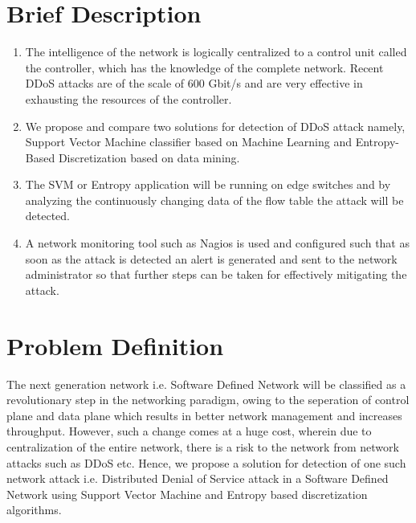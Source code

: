 \documentclass[12pt,a4paper,final]{report}
\begin{document}
\section{Brief Description}
\begin{enumerate}
\item 
The intelligence of the network is logically centralized to a control unit called the controller, which has the knowledge of the complete network. Recent DDoS attacks are of the scale of 600 Gbit/s and are very effective in exhausting the resources of the controller.

\item
We propose and compare two solutions for detection of DDoS attack namely, Support Vector Machine classifier based on Machine Learning and Entropy-Based Discretization based on data mining.

\item
The SVM or Entropy application will be running on edge switches and by analyzing the continuously changing data of the flow table the attack will be detected.

\item
A network monitoring tool such as Nagios is used and configured such that as soon as the attack is detected an alert is generated and sent to the network administrator so that further steps can be taken for effectively mitigating the attack.
\end{enumerate}

\section{Problem Definition}
The next generation network i.e. Software Defined Network will be classified as a revolutionary step in the networking paradigm, owing to the seperation of control plane and data plane which results in better network management and increases throughput. However, such a change comes at a huge cost, wherein due to centralization of the entire network, there is a risk to the network from network attacks such as DDoS etc. Hence, we propose a solution for detection of one such network attack i.e. Distributed Denial of Service attack in a Software Defined Network using Support Vector Machine and Entropy based discretization algorithms.
\end{document}
